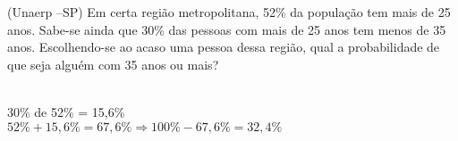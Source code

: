 \begin{ex}
(Unaerp –SP) Em certa região metropolitana, 52\% da população  tem mais de 25 anos. Sabe-se ainda que 30\% das pessoas com mais de 25 anos tem menos de 35 anos.  Escolhendo-se ao acaso uma pessoa dessa região, qual a probabilidade de que seja alguém com 35 anos ou mais?
  \begin{sol}
    \phantom{A}\\
    30\% de 52\% = 15,6\% \\
  $52\%+15,6\%=67,6\% \Longrightarrow 100\%-67,6\%=32,4\%$
  \end{sol}
\end{ex}